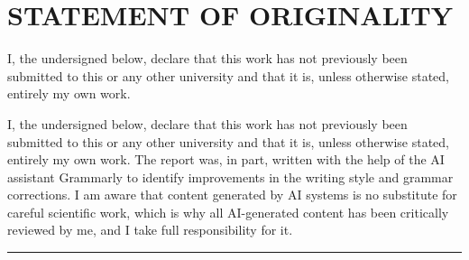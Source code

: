 \documentclass[../report.tex]{subfiles}
\begin{document}
    \section*{STATEMENT OF ORIGINALITY}

     I, the undersigned below, declare that this work has not previously been submitted to this or any other university and that it is, unless otherwise stated, entirely my own work.
    \newline

    \noindent
    I, the undersigned below, declare that this work has not previously been submitted to this or any other university and that it is, unless otherwise stated, entirely my own work. The report was, in part, written with the help of the AI assistant Grammarly to identify improvements in the writing style and
    grammar corrections. I am aware that content generated by AI systems is no substitute for careful scientific work, which is why all AI-generated content has been critically reviewed by me, and I take full responsibility for it.

    \vspace{1cm}

    \hrule width 0.45\linewidth
    \hfill \hspace{0.025\linewidth}
    \hrulefill

\end{document}
